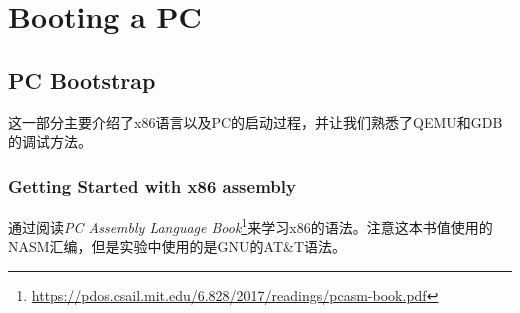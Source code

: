 \chapter{Booting a PC}
\label{cha:booting_a_pc}

\section{PC Bootstrap}
\par 这一部分主要介绍了x86语言以及PC的启动过程，并让我们熟悉了QEMU和GDB的调试方法。

\subsection{Getting Started with x86 assembly}
\par 通过阅读\emph{PC Assembly Language Book}\footnote{\url{https://pdos.csail.mit.edu/6.828/2017/readings/pcasm-book.pdf}}来学习x86的语法。注意这本书值使用的NASM汇编，但是实验中使用的是GNU的AT\&T语法。

